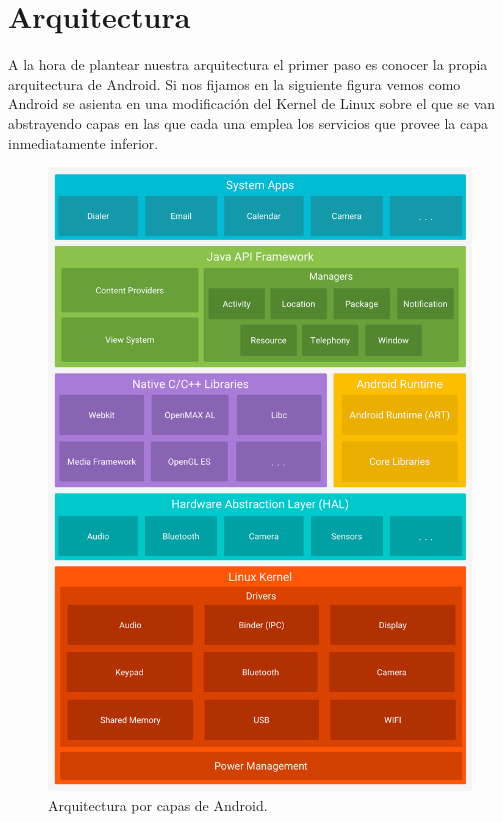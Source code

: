 \documentclass[12pt,a4paper,oneside]{book} %
\begin{document}
\section{Arquitectura}
A la hora de plantear nuestra arquitectura el primer paso es conocer la propia arquitectura de Android.
\newline
\newline
Si nos fijamos en la siguiente figura vemos como Android se asienta en una modificación del Kernel de Linux sobre el que se van abstrayendo capas en las que cada una emplea los servicios que provee la capa inmediatamente inferior. 
\begin{figure}[H]
	\begin{center}
		\includegraphics[scale=0.15]{pictures/architecture/android_stack.png} %
	\end{center}
	\caption[Android stack]{Arquitectura por capas de Android.}
\end{figure}
\end{document}
